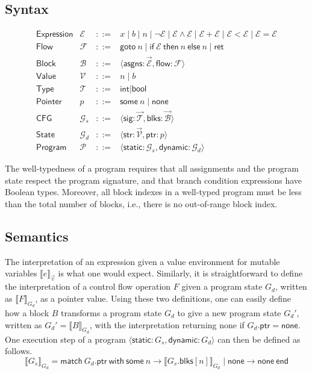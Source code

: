 \documentclass[11pt]{article}
\newcommand{\mce}{\mathcal{E}}
\newcommand{\mcf}{\mathcal{F}}
\newcommand{\mcb}{\mathcal{B}}
\newcommand{\mcv}{\mathcal{V}}
\newcommand{\mcp}{\mathcal{P}}
\newcommand{\mcg}{\mathcal{G}}
\newcommand{\mct}{\mathcal{T}}
\newcommand{\fgoto}[1]{\textsf{goto}~#1}
\newcommand{\fif}[3]{\textsf{if}~#1~\textsf{then}~#2~\textsf{else}~#3}
\newcommand{\fret}{\textsf{ret}}
\newcommand{\none}{\textsf{none}}
\newcommand{\some}[1]{\textsf{some}~#1}
\newcommand{\tint}{\textsf{int}}
\newcommand{\tbool}{\textsf{bool}}
\newcommand{\matchwith}[2]{\textsf{match}~#1~\textsf{with}~#2~\textsf{end}}
\newcommand{\asgns}{\textsf{asgns}}
\newcommand{\flow}{\textsf{flow}}
\newcommand{\blks}{\textsf{blks}}
\newcommand{\static}{\textsf{static}}
\newcommand{\dynamic}{\textsf{dynamic}}
\newcommand{\sig}{\textsf{sig}}
\newcommand{\str}{\textsf{str}}
\newcommand{\ptr}{\textsf{ptr}}
\begin{document}
\subsection{Syntax}
\[
\begin{array}{llcl}
\textsf{Expression} & \mce{} & ::= & x
\mid b
\mid n
\mid \neg \mce{}
\mid \mce{} \land \mce{}
\mid \mce{} + \mce{}
\mid \mce{} < \mce{}
\mid \mce{} = \mce{}
\\

\textsf{Flow} & \mcf{} & ::= & \fgoto n
\mid \fif{\mce{}}{n}{n}
\mid \fret
\\

\textsf{Block} & \mcb{} & ::= & \langle \asgns{} : \vec{\mce{}}, \flow{} : \mcf{} \rangle
\\

\textsf{Value} & \mcv{} & ::= & n
\mid b
\\

\textsf{Type} & \mct{} & ::= & \tint{}
\mid \tbool{}
\\

\textsf{Pointer} & p & ::= & \some{n}
\mid \none{}
\\

\textsf{CFG} & \mcg{}_s & ::= & \langle \sig{} : \vec{\mct{}}, \blks{} : \vec{\mcb{}} \rangle
\\

\textsf{State} & \mcg{}_d & ::= & \langle \str{} : \vec{\mcv{}}, \ptr{} : p \rangle
\\

\textsf{Program} & \mcp{} & ::= & \langle \static{} : \mcg{}_s, \dynamic{} : \mcg{}_d \rangle
\end{array}
\]

The well-typedness of a program requires that all assignments and the program state respect the program signature, and that branch condition expressions have Boolean types.
Moreover, all block indexes in a well-typed program must be less than the total number of blocks, i.e., there is no out-of-range block index.

\subsection{Semantics}
The interpretation of an expression given a value environment for mutable variables $\llbracket e \rrbracket_{\vec{v}}$ is what one would expect.
Similarly, it is straightforward to define the interpretation of a control flow operation $F$ given a program state $G_d$, written as $\llbracket F \rrbracket_{G_d}$, as a pointer value.
Using these two definitions, one can easily define how a block $B$ transforms a program state $G_d$ to give a new program state $G_d'$, written as $G_d' = \llbracket B \rrbracket_{G_d}$, with the interpretation returning \none{} if $G_d.\ptr{} = \none{}$.
One execution step of a program $\langle \static{}: G_s, \dynamic{}: G_d \rangle$ can then be defined as follows.
\[
\llbracket G_s \rrbracket_{G_d} =
\matchwith{G_d.\ptr{}}
{\some{n} \rightarrow \llbracket G_s.\blks{}[n] \rrbracket_{G_d}
\mid \none{} \rightarrow \none{}}
\]
\end{document}
